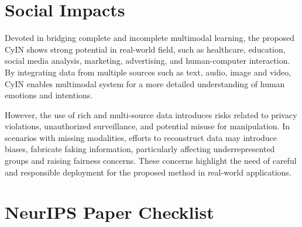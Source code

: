 \documentclass{article}
\begin{document}
\section{Social Impacts}
\label{appendix_social_impact}
Devoted in bridging complete and incomplete multimodal learning, the proposed CyIN shows strong potential in real-world field, such as healthcare, education, social media analysis, marketing, advertising, and human-computer interaction. By integrating data from multiple sources such as text, audio, image and video, CyIN enables multimodal system for a more detailed understanding of human emotions and intentions.

However, the use of rich and multi-source data introduces risks related to privacy violations, unauthorized surveillance, and potential misuse for manipulation. In scenarios with missing modalities, efforts to reconstruct data may introduce biases, fabricate faking information, particularly affecting underrepresented groups and raising fairness concerns. These concerns highlight the need of careful and responsible deployment for the proposed method in real-world applications.


\newpage
\section*{NeurIPS Paper Checklist}


\end{document}

